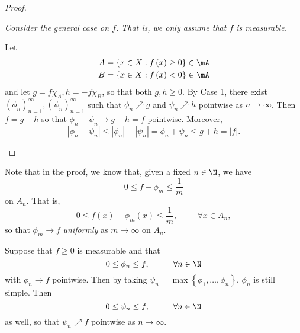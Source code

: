 \documentclass[pmath451]{subfiles}
\begin{document}
\begin{proof}
        \begin{case}
            \textit{Consider the general case on $f$. That is, we only assume that $f$ is measurable.}

            Let
            \begin{equation*}
                \begin{aligned}
                    A & = \left\lbrace x\in X: f\left( x \right)\geq 0 \right\rbrace\in\mA \\
                    B & = \left\lbrace x\in X: f\left( x \right)< 0 \right\rbrace\in\mA \\
                \end{aligned} 
            \end{equation*}
            and let $g=f\chi_A, h=-f\chi_B$, so that both $g,h\geq 0$. By Case 1, there exist $\left( \phi_{n} \right)^{\infty}_{n=1}, \left( \psi_{n} \right)^{\infty}_{n=1}$ such that $\phi_n\nearrow g$ and $\psi_n\nearrow h$ pointwise as $n\to\infty$. Then $f=g-h$ so that $\phi_n-\psi_n\to g-h = f$ pointwise. Moreover,
            \begin{equation*}
                \left| \phi_n-\psi_n \right| \leq \left| \phi_n \right| + \left| \psi_n \right| = \phi_n+\psi_n \leq g+h = \left| f \right|.
            \end{equation*}
        \end{case}
    \end{proof}

    \clearpage
    
    \np Note that in the proof, we know that, given a fixed $n\in\N$, we have
    \begin{equation*}
        0\leq f-\phi_m \leq \frac{1}{m}
    \end{equation*}
    on $A_n$. That is,
    \begin{equation*}
        0\leq f\left( x \right)-\phi_m\left( x \right) \leq \frac{1}{m},\hspace{1cm}\forall x\in A_n,
    \end{equation*}
    so that $\phi_m\to f$ \textit{uniformly} as $m\to\infty$ on $A_n$.

    \np Suppose that $f\geq 0$ is measurable and that
    \begin{equation*}
        0\leq \phi_n \leq f,\hspace{1cm}\forall n\in\N
    \end{equation*}
    with $\phi_n\to f$ pointwise. Then by taking $\psi_n = \max\left\lbrace \phi_1,\ldots,\phi_n \right\rbrace$, $\phi_n$ is still simple. Then
    \begin{equation*}
        0\leq\psi_n\leq f,\hspace{1cm}\forall n\in\N
    \end{equation*}
    as well, so that $\psi_n\nearrow f$ pointwise as $n\to\infty$.
    
\end{document}

